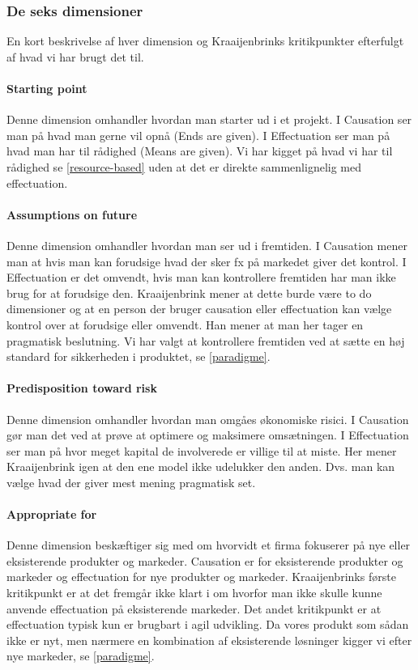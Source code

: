 \subsubsection{De seks dimensioner}
En kort beskrivelse af hver dimension og Kraaijenbrinks kritikpunkter efterfulgt af hvad vi har brugt det til.

\paragraph{Starting point}
Denne dimension omhandler hvordan man starter ud i et projekt.
I Causation ser man på hvad man gerne vil opnå (Ends are given).
I Effectuation ser man på hvad man har til rådighed (Means are given).
Vi har kigget på hvad vi har til rådighed se \cref{resource-based} uden at det er direkte sammenlignelig med effectuation.

\paragraph{Assumptions on future}
Denne dimension omhandler hvordan man ser ud i fremtiden.
I Causation mener man at hvis man kan forudsige hvad der sker fx på markedet giver det kontrol.
I Effectuation er det omvendt, hvis man kan kontrollere fremtiden har man ikke brug for at forudsige den.
Kraaijenbrink mener at dette burde være to do dimensioner og at en person der bruger causation eller effectuation kan vælge kontrol over at forudsige eller omvendt.
Han mener at man her tager en pragmatisk beslutning.
Vi har valgt at kontrollere fremtiden ved at sætte en høj standard for sikkerheden i produktet, se \cref{paradigme}.

\paragraph{Predisposition toward risk}
Denne dimension omhandler hvordan man omgåes økonomiske risici.
I Causation gør man det ved at prøve at optimere og maksimere omsætningen.
I Effectuation ser man på hvor meget kapital de involverede er villige til at miste.
Her mener Kraaijenbrink igen at den ene model ikke udelukker den anden.
Dvs. man kan vælge hvad der giver mest mening pragmatisk set.

\paragraph{Appropriate for}
Denne dimension beskæftiger sig med om hvorvidt et firma fokuserer på nye eller eksisterende produkter og markeder.
Causation er for eksisterende produkter og markeder og effectuation for nye produkter og markeder.
Kraaijenbrinks første kritikpunkt er at det fremgår ikke klart i \citet{sarasvathy2001effectuation} om hvorfor man ikke skulle kunne anvende effectuation på eksisterende markeder.
Det andet kritikpunkt er at effectuation typisk kun er brugbart i agil udvikling.
Da vores produkt som sådan ikke er nyt, men nærmere en kombination af eksisterende løsninger kigger vi efter nye markeder, se \cref{paradigme}.

